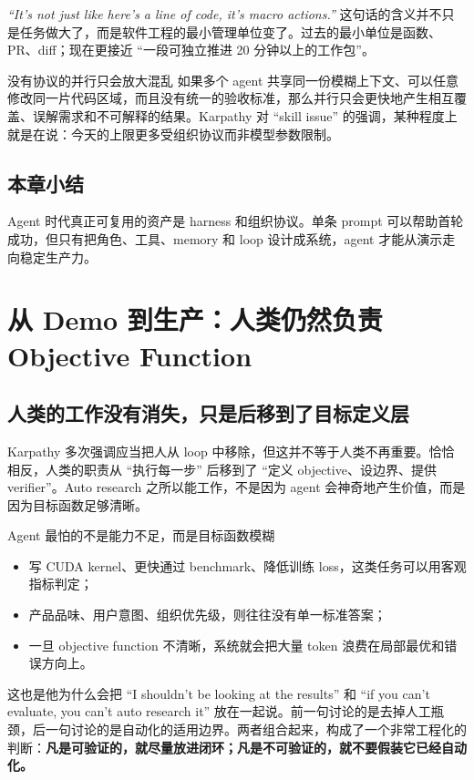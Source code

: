 \documentclass[a4paper]{article}
\begin{document}
\textit{``It's not just like here's a line of code, it's macro actions.''} 这句话的含义并不只是任务做大了，而是软件工程的最小管理单位变了。过去的最小单位是函数、PR、diff；现在更接近 ``一段可独立推进 20 分钟以上的工作包''。

\begin{warningbox}{没有协议的并行只会放大混乱}
如果多个 agent 共享同一份模糊上下文、可以任意修改同一片代码区域，而且没有统一的验收标准，那么并行只会更快地产生相互覆盖、误解需求和不可解释的结果。Karpathy 对 ``skill issue'' 的强调，某种程度上就是在说：今天的上限更多受组织协议而非模型参数限制。
\end{warningbox}

\subsection{本章小结}
Agent 时代真正可复用的资产是 harness 和组织协议。单条 prompt 可以帮助首轮成功，但只有把角色、工具、memory 和 loop 设计成系统，agent 才能从演示走向稳定生产力。


\section{从 Demo 到生产：人类仍然负责 Objective Function}

\subsection{人类的工作没有消失，只是后移到了目标定义层}
Karpathy 多次强调应当把人从 loop 中移除，但这并不等于人类不再重要。恰恰相反，人类的职责从 ``执行每一步'' 后移到了 ``定义 objective、设边界、提供 verifier''。Auto research 之所以能工作，不是因为 agent 会神奇地产生价值，而是因为目标函数足够清晰。

\begin{importantbox}{Agent 最怕的不是能力不足，而是目标函数模糊}
\begin{itemize}
    \item 写 CUDA kernel、更快通过 benchmark、降低训练 loss，这类任务可以用客观指标判定；
    \item 产品品味、用户意图、组织优先级，则往往没有单一标准答案；
    \item 一旦 objective function 不清晰，系统就会把大量 token 浪费在局部最优和错误方向上。
\end{itemize}
\end{importantbox}

这也是他为什么会把 ``I shouldn't be looking at the results'' 和 ``if you can't evaluate, you can't auto research it'' 放在一起说。前一句讨论的是去掉人工瓶颈，后一句讨论的是自动化的适用边界。两者组合起来，构成了一个非常工程化的判断：\textbf{凡是可验证的，就尽量放进闭环；凡是不可验证的，就不要假装它已经自动化。}
\end{document}
